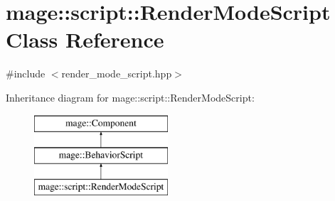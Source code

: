 \hypertarget{classmage_1_1script_1_1_render_mode_script}{}\section{mage\+:\+:script\+:\+:Render\+Mode\+Script Class Reference}
\label{classmage_1_1script_1_1_render_mode_script}


{\ttfamily \#include $<$render\+\_\+mode\+\_\+script.\+hpp$>$}

Inheritance diagram for mage\+:\+:script\+:\+:Render\+Mode\+Script\+:\begin{figure}[H]
\begin{center}
\leavevmode
\includegraphics[height=3.000000cm]{classmage_1_1script_1_1_render_mode_script}
\end{center}
\end{figure}

